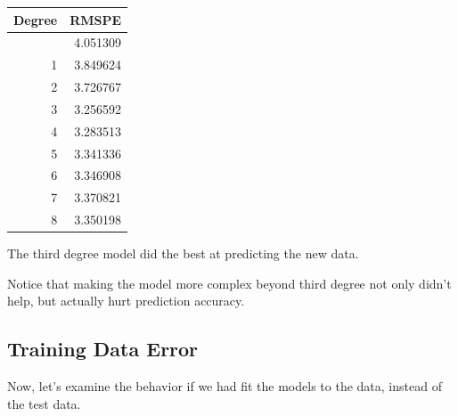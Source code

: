 \documentclass[
  letterpaper,
  DIV=11,
  numbers=noendperiod]{scrreprt}
\begin{document}
\begin{longtable}[]{@{}rr@{}}
\toprule\noalign{}
Degree & RMSPE \\
\midrule\noalign{}
\endhead
\bottomrule\noalign{}
\endlastfoot
0 & 4.051309 \\
1 & 3.849624 \\
2 & 3.726767 \\
3 & 3.256592 \\
4 & 3.283513 \\
5 & 3.341336 \\
6 & 3.346908 \\
7 & 3.370821 \\
8 & 3.350198 \\
\end{longtable}

The third degree model did the best at predicting the new data.

Notice that making the model more complex beyond third degree not only
didn't help, but actually hurt prediction accuracy.

\subsection{Training Data Error}\label{training-data-error}

Now, let's examine the behavior if we had fit the models to the data,
instead of the test data.
\end{document}
